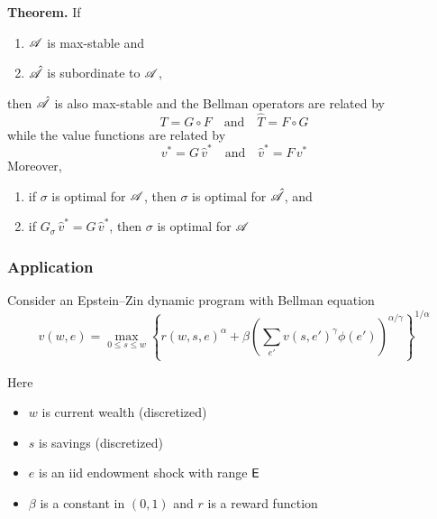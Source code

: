\documentclass[dvipsnames]{beamer}
\begin{document}
\begin{frame}
    
    {\bf Theorem.}
    If 
    \begin{enumerate}
        \item $\mathscr A$ is max-stable and
        \item $\hat {\mathscr A}$ is subordinate to $\mathscr A$, 
    \end{enumerate}
    then 
    $\hat {\mathscr A}$ is also max-stable and the Bellman operators are related by
    \begin{equation*}
        T = G \circ F
        \quad \text{and} \quad
        \hat T = F \circ G
    \end{equation*}
    while  the value functions are related by 
    \begin{equation*}
        v^* = G \, \hat v^*
        \quad \text{and} \quad
        \hat v^* = F \, v^*
    \end{equation*}
    Moreover, 
    \begin{enumerate}
        \item if $\sigma$ is optimal for $\mathscr A$, then $\sigma$ is optimal
            for $\hat {\mathscr A}$, and
        \item if $G_\sigma \, \hat v^* = G \, \hat v^*$, then $\sigma$ is
            optimal for $\mathscr A$
    \end{enumerate}

\end{frame}


\begin{frame}
    \frametitle{Application}
    
    Consider an Epstein--Zin dynamic program with Bellman equation
    \begin{equation*}
        v(w, e) = 
        \max_{0 \leq s \leq w}
            \left\{
                r(w, s, e)^\alpha + \beta 
                \left( \sum_{e'} v(s, e')^\gamma \phi(e') \right)^{\alpha/ \gamma}
            \right\}^{1/\alpha}
    \end{equation*}

    Here 
    \begin{itemize}
        \item $w$ is current wealth (discretized)
            \vspace{0.5em}
        \item $s$ is savings (discretized)
            \vspace{0.5em}
        \item $e$ is an {\sc iid} endowment shock with range $\mathsf E$  
            \vspace{0.5em}
        \item $\beta$ is a constant in $(0,1)$ and $r$ is a reward function
    \end{itemize}


\end{frame}
\end{document}
